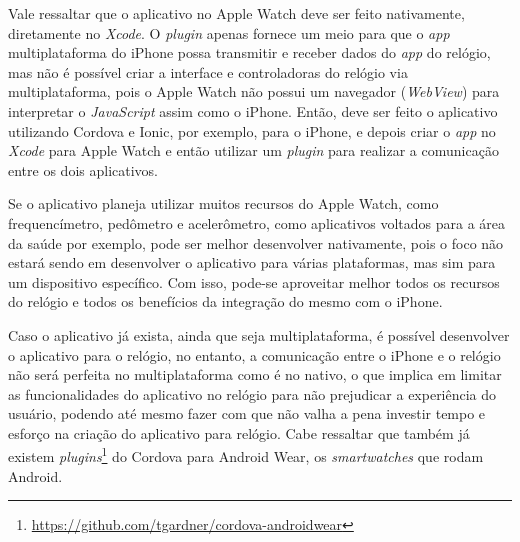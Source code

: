 Vale ressaltar que o aplicativo no Apple Watch deve ser feito nativamente, diretamente no \textit{Xcode}. O \textit{plugin} apenas fornece um meio para que o \textit{app} multiplataforma do iPhone possa transmitir e receber 
dados do \textit{app} do relógio, mas não é possível criar a interface e controladoras do relógio via multiplataforma, pois o Apple Watch não possui um navegador (\textit{WebView}) para interpretar o \textit{JavaScript} assim 
como o iPhone. Então, deve ser feito o aplicativo utilizando Cordova e Ionic, por exemplo, para o iPhone, e depois criar o \textit{app} no \textit{Xcode} para Apple Watch e então utilizar um \textit{plugin} para realizar a 
comunicação entre os dois aplicativos.  

Se o aplicativo planeja utilizar muitos recursos do Apple Watch, como frequencímetro, pedômetro e acelerômetro, como aplicativos voltados para a área da saúde por exemplo, pode ser melhor desenvolver nativamente,
pois o foco não estará sendo em desenvolver o aplicativo para várias plataformas, mas sim para um dispositivo específico. Com isso, pode-se aproveitar melhor todos os recursos do relógio e todos os benefícios da integração
do mesmo com o iPhone.

Caso o aplicativo já exista, ainda que seja multiplataforma, é possível desenvolver o aplicativo para o relógio, no entanto, a comunicação entre o iPhone e o relógio não será perfeita no multiplataforma como é no nativo, 
o que implica em limitar as funcionalidades do aplicativo no relógio para não prejudicar a experiência do usuário, podendo até mesmo fazer com que não valha a pena investir tempo e esforço na criação do aplicativo para
relógio. Cabe ressaltar que também já existem \textit{plugins}\footnote{\url{https://github.com/tgardner/cordova-androidwear}} do Cordova para Android Wear, os \textit{smartwatches} que rodam Android.

